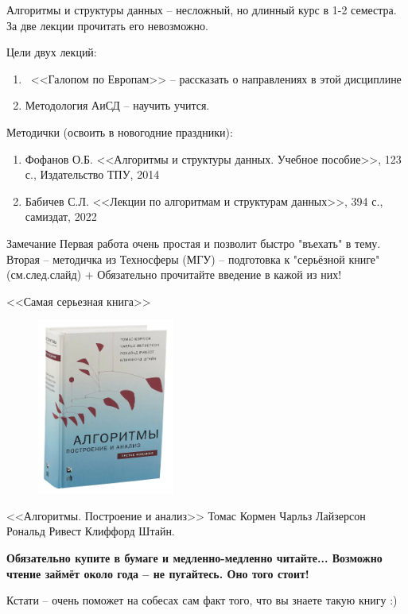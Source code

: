 \begin{frame}
\footnotesize
Алгоритмы и структуры данных -- несложный, но длинный курс в 1-2 семестра. 
За две лекции прочитать его невозможно. 

Цели двух лекций:
\begin{enumerate}
	\item ~<<Галопом по Европам>> -- рассказать о направлениях в этой дисциплине
	\item Методология АиСД -- научить учится.
\end{enumerate}

Методички (освоить в новогодние праздники):
\begin{enumerate}
	\item Фофанов О.Б. <<Алгоритмы и структуры данных. Учебное пособие>>, 123 с., Издательство ТПУ, 2014
	\item Бабичев С.Л. <<Лекции по алгоритмам и структурам данных>>, 394 с., самиздат, 2022
\end{enumerate}

\begin{block}{Замечание}
Первая работа очень простая и позволит быстро "въехать" в тему. 
Вторая -- методичка из Техносферы (МГУ) -- подготовка к "серьёзной книге" (см.след.слайд)
+ Обязательно прочитайте введение в кажой из них!
\end{block}

\end{frame}


\begin{frame}{<<Самая серьезная книга>>}


 \begin{figure}
	\centering
\includegraphics[width=0.4\textwidth]{./../pic/Kormen_3_edition_book_img.png}
\end{figure}
<<Алгоритмы. Построение и анализ>>
Томас Кормен
Чарльз Лайзерсон
Рональд Ривест
Клиффорд Штайн.


\textbf{
	Обязательно купите в бумаге 
	и медленно-медленно читайте...
	Возможно чтение займёт около года -- не пугайтесь. Оно того стоит!
}

Кстати -- очень поможет на собесах сам факт того, что вы знаете такую книгу :)

\end{frame}



